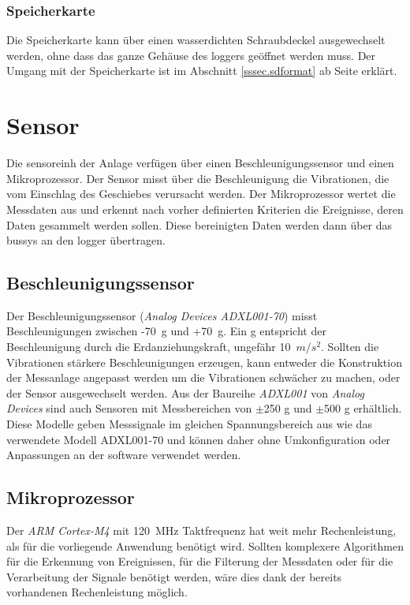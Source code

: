 \subsubsection{Speicherkarte}
Die Speicherkarte kann über einen wasserdichten Schraubdeckel ausgewechselt werden, ohne dass das ganze Gehäuse des \gls{logger}s geöffnet werden muss. Der Umgang mit der Speicherkarte ist im Abschnitt \ref{sssec.sdformat} ab Seite \pageref{sssec.sdformat} erklärt.











\section{Sensor}\label{sec.manualsensor}
Die \gls{sensoreinh} der Anlage verfügen über einen Beschleunigungssensor und einen Mikroprozessor. Der Sensor misst über die Beschleunigung die Vibrationen, die vom Einschlag des Geschiebes verursacht werden. Der Mikroprozessor wertet die Messdaten aus und erkennt nach vorher definierten Kriterien die Ereignisse, deren Daten gesammelt werden sollen. Diese bereinigten Daten werden dann über das \gls{bussys} an den \gls{logger} übertragen.

\subsection{Beschleunigungssensor}
Der Beschleunigungssensor (\emph{Analog Devices ADXL001-70}) misst Beschleunigungen zwischen -70~g und +70~g. Ein g entspricht der Beschleunigung durch die Erdanziehungskraft, ungefähr 10~\ensuremath{m/s^2}. Sollten die Vibrationen stärkere Beschleunigungen erzeugen, kann entweder die Konstruktion der Messanlage angepasst werden um die Vibrationen schwächer zu machen, oder der Sensor ausgewechselt werden. Aus der Baureihe \emph{ADXL001} von \emph{Analog Devices} sind auch Sensoren mit Messbereichen von \ensuremath{\pm}250 g und \ensuremath{\pm}500 g erhältlich. Diese Modelle geben Messsignale im gleichen Spannungsbereich aus wie das verwendete Modell ADXL001-70 und können daher ohne Umkonfiguration oder Anpassungen an der \gls{software} verwendet werden.

\subsection{Mikroprozessor}
Der \emph{ARM Cortex-M4} mit 120~MHz Taktfrequenz hat weit mehr Rechenleistung, als für die vorliegende Anwendung benötigt wird. Sollten komplexere Algorithmen für die Erkennung von Ereignissen, für die Filterung der Messdaten oder für die Verarbeitung der Signale benötigt werden, wäre dies dank der bereits vorhandenen Rechenleistung möglich.

